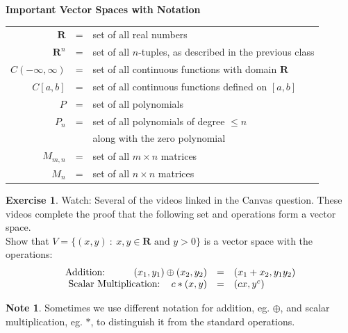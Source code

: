 \documentclass{beamer}
\newcommand{\R}{\mathbf{R}}
\newcommand{\fn}{\insertframenumber}
\theoremstyle{definition}
\newtheorem{exercise}{Exercise}
\newtheorem*{nb}{Note}
\begin{document}
\begin{frame}{\fn}
	\begin{block}{\textbf{Important Vector Spaces with Notation}}
		\begin{tabular}{rcl}
			$\R$&=&set of all real numbers\\
			$\R^n$&=&set of all $n$-tuples, as described in the previous class\\
			$C(-\infty,\infty)$&=&set of all continuous functions with domain $\R$\\
			$C[a,b]$&=&set of all continuous functions defined on $[a,b]$\\
			$P$&=&set of all polynomials\\
			$P_n$&=&set of all polynomials of degree $\leq n$\\ &&along with the zero polynomial\\
			$M_{m,n}$&=&set of all $m\times n$ matrices\\
			$M_n$&=&set of all $n\times n$ matrices
		\end{tabular}
	\end{block}
\end{frame}
\begin{frame}{\fn}
	\begin{exercise}
	 	Watch: Several of the videos linked in the Canvas question. These videos complete the proof that the following set and operations form a vector space.\\
	 	Show that $V=\{(x,y)\ :\ x,y\in\R \text{ and }y> 0\}$ is a vector space with the operations:
	 	$$\begin{array}{rcl}	
	 		\text{Addition: \hspace*{.35in}} (x_1,y_1)\oplus (x_2,y_2)&=&(x_1+x_2,y_1y_2)\\
	 		\text{Scalar Multiplication: \hspace*{.1in}} c*(x,y)&=&(cx,y^c)
	 		\end{array}$$
	\end{exercise}
	\begin{nb}
		Sometimes we use different notation for addition, eg. $\oplus$, and scalar multiplication, eg. $*$, to distinguish it from the standard operations.
	\end{nb}
\end{frame}
\end{document}
